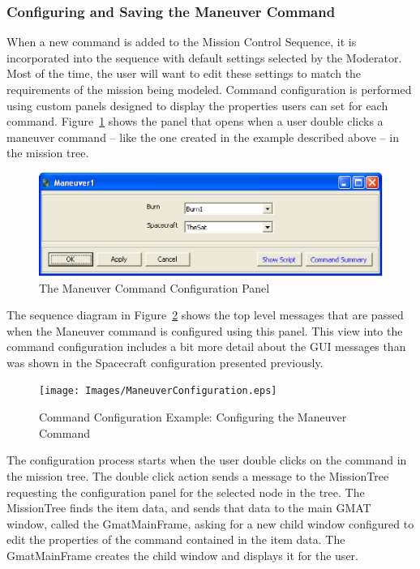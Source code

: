 \subsubsection{\label{section:CommandConfiguration}Configuring and Saving the Maneuver Command}

When a new command is added to the Mission Control Sequence, it is incorporated into the sequence
with default settings selected by the Moderator.  Most of the time, the user will want to edit
these settings to match the requirements of the mission being modeled.  Command configuration is
performed using custom panels designed to display the properties users can set for each command.
Figure~\ref{figure:ManeuverConfigPanel} shows the panel that opens when a user double clicks a
maneuver command -- like the one created in the example described above -- in the mission tree.

\begin{figure}[htb]
\begin{center}
\includegraphics[scale=0.5]{Images/ManeuverPanel.eps}
\caption{\label{figure:ManeuverConfigPanel}The Maneuver Command Configuration Panel}
\end{center}
\end{figure}

The sequence diagram in Figure~\ref{figure:ManeuverConfiguration} shows the top level messages that
are passed when the Maneuver command is configured using this panel.  This view into the command
configuration includes a bit more detail about the GUI messages than was shown in the Spacecraft
configuration presented previously.

\begin{figure}[htb]
\begin{center}
\texttt{[image: Images/ManeuverConfiguration.eps]}
\caption{\label{figure:ManeuverConfiguration}Command Configuration Example: Configuring the Maneuver
Command}
\end{center}
\end{figure}

The configuration process starts when the user double clicks on the command in the mission tree. 
The double click action sends a message to the MissionTree requesting the configuration panel for
the
selected node in the tree.  The MissionTree finds the item data, and sends that data to the main
GMAT window, called the GmatMainFrame, asking for a new child window configured to edit the
properties of the command contained in the item data.  The GmatMainFrame creates the child window
and displays it for the user.

